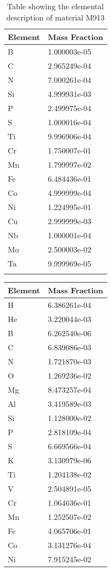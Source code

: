 \begin{centering}
\begin{longtable}[ht!]
{ p{} | p{} }
\hline
Element & Mass Fraction\\
\hline
B &  1.000003e-05\\
C &  2.965249e-04\\
N &  7.000261e-04\\
Si &  4.999931e-03\\
P &  2.499975e-04\\
S &  1.000016e-04\\
Ti &  9.996906e-04\\
Cr &  1.750007e-01\\
Mn &  1.799997e-02\\
Fe &  6.484436e-01\\
Co &  4.999999e-04\\
Ni &  1.224995e-01\\
Cu &  2.999999e-03\\
Nb &  1.000001e-04\\
Mo &  2.500003e-02\\
Ta &  9.999969e-05\\
\caption{Table showing the elemental description of material M913}
\label{table:material_EppDucts}
\end{longtable}
\clearpage
\begin{longtable}[ht!]
{ p{} | p{} }
\hline
Element & Mass Fraction\\
\hline
H &  6.386261e-04\\
He &  3.220044e-03\\
B &  6.262540e-06\\
C &  6.839086e-03\\
N &  1.721870e-03\\
O &  1.269236e-02\\
Mg &  8.473257e-04\\
Al &  3.419589e-03\\
Si &  1.128000e-02\\
P &  2.818109e-04\\
S &  6.669566e-04\\
K &  3.130979e-06\\
Ti &  1.204138e-02\\
V &  2.504891e-05\\
Cr &  1.064636e-01\\
Mn &  1.252507e-02\\
Fe &  4.065706e-01\\
Co &  3.131276e-04\\
Ni &  7.915245e-02\\

\end{longtable}
\end{centering}
